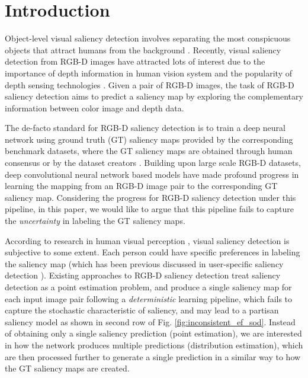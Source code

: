\documentclass[10pt,twocolumn,letterpaper]{article}
\begin{document}
\section{Introduction}
Object-level visual saliency detection involves separating the most conspicuous objects that attract humans from the background \cite{itti_saliency,achanta2009frequency,Iter_Coop_CVPR,Zhang_2018_CVPR,Liu_2019_ICCV,F3Net_aaai2020,jing2020weakly}. Recently, visual saliency detection from RGB-D images have attracted lots of interest due to the importance of depth information in human vision system and the popularity of depth sensing technologies \cite{dmra_iccv19,zhao2019Contrast}. Given a pair of RGB-D images, the task of RGB-D saliency detection aims to predict a saliency map by exploring the complementary information between color image and depth data. 



The de-facto standard for RGB-D saliency detection is to train a deep neural network using ground truth (GT) saliency maps provided by the corresponding benchmark datasets, where the GT saliency maps are obtained through human consensus or by the dataset creators \cite{sip_dataset}. 
Building upon large scale RGB-D datasets, deep convolutional neural network based models \cite{Fu2020JLDCF,dmra_iccv19,chen2019three,han2017cnns} have made profound progress in learning the mapping from an RGB-D image pair to the corresponding GT saliency map. Considering the progress for RGB-D saliency detection under this pipeline, in this paper, we would like to argue that this pipeline fails to capture the \textit{uncertainty} in labeling the GT saliency maps. 

According to research in human visual perception \cite{scanpath}, visual saliency detection is subjective to some extent. Each person could have specific preferences in labeling the saliency map (which has been previous discussed in user-specific saliency detection \cite{ITTI20001489}). Existing approaches to RGB-D saliency detection treat saliency detection as a point estimation problem, and produce a single saliency map for each input image pair following a \textit{deterministic} learning pipeline, which fails to capture the stochastic characteristic of saliency, and may lead to a partisan saliency model as shown in second row of Fig. \ref{fig:inconsistent_ef_sod}. 
Instead of obtaining only a single saliency prediction (point estimation), we are interested in how the network produces multiple predictions (distribution estimation), which are then processed further to generate a single prediction in a similar way to how the GT saliency maps are created.
\end{document}

